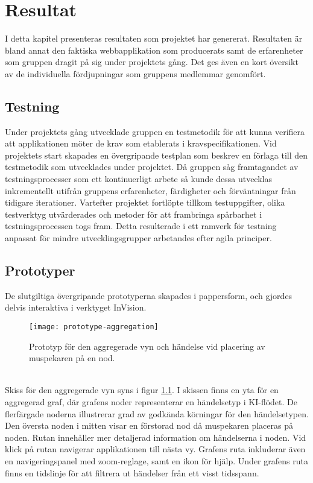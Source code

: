 \chapter{Resultat}
\label{cha:results}
I detta kapitel presenteras resultaten som projektet har genererat. Resultaten är bland annat den faktiska webbapplikation som producerats samt de erfarenheter som gruppen dragit på sig under projektets gång. Det ges även en kort översikt av de individuella fördjupningar som gruppens medlemmar genomfört.
\section{Testning}
Under projektets gång utvecklade gruppen en testmetodik för att kunna verifiera att applikationen möter de krav som etablerats i kravspecifikationen. Vid projektets start skapades en övergripande testplan som beskrev en förlaga till den testmetodik som utvecklades under projektet. Då gruppen såg framtagandet av testningsprocesser som ett kontinuerligt arbete så kunde dessa utvecklas inkrementellt utifrån gruppens erfarenheter, färdigheter och förväntningar från tidigare iterationer. Vartefter projektet fortlöpte tillkom testuppgifter, olika testverktyg utvärderades och metoder för att frambringa spårbarhet i testningsprocessen togs fram. Detta resulterade i ett ramverk för testning anpassat för mindre utvecklingsgrupper arbetandes efter agila principer.

\section{Prototyper}
\label{sec:result-prototypes}
De slutgiltiga övergripande prototyperna skapades i pappersform, och gjordes delvis interaktiva i verktyget InVision. 

\begin{figure}[H]
    \centering
    \texttt{[image: prototype-aggregation]}
    \caption{Prototyp för den aggregerade vyn och händelse vid placering av muspekaren på en nod.}
    \label{fig:prototype-aggregation}
\end{figure}
\ \\
Skiss för den aggregerade vyn syns i figur \ref{fig:prototype-aggregation}. 
I skissen finns en yta för en aggregerad graf, där grafens noder representerar en händelsetyp i KI-flödet. 
De flerfärgade noderna illustrerar grad av godkända körningar för den händelsetypen. Den översta noden i mitten visar en förstorad nod då muspekaren placeras på noden. 
Rutan innehåller mer detaljerad information om händelserna i noden. Vid klick på rutan navigerar applikationen till nästa vy. 
Grafens ruta inkluderar även en navigeringspanel med zoom-reglage, samt en ikon för hjälp. 
Under grafens ruta finns en tidslinje för att filtrera ut händelser från ett visst tidsspann. 

